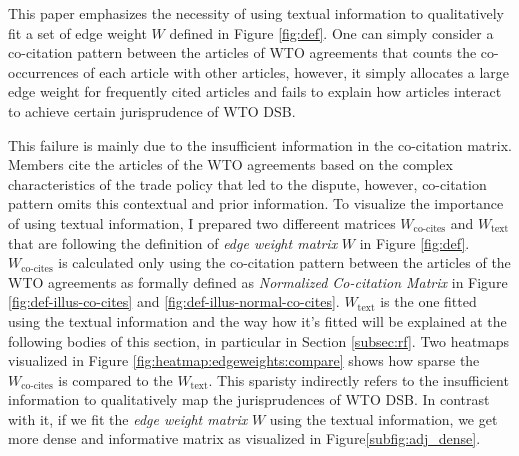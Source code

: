 This paper emphasizes the necessity of using textual information 
to qualitatively fit a set of edge weight $W$ defined in Figure \ref{fig:def}. %
One can simply consider a co-citation pattern between the articles of WTO agreements that counts the co-occurrences of each article with other articles, however,
it simply allocates a large edge weight for frequently cited articles and fails to explain how articles interact to achieve certain jurisprudence of WTO DSB. %

This failure is mainly due to the insufficient information in the co-citation matrix. Members cite the articles of 
the WTO agreements based on the complex characteristics of 
the trade policy that led to the dispute, however, co-citation pattern omits this contextual and prior information. To visualize the importance of using textual information, I prepared two differeent matrices $W_{\text{co-cites}}$ and $W_{\text{text}}$ that are following the definition of \textit{edge weight matrix} $W$ in Figure \ref{fig:def}.
$W_{\text{co-cites}}$ is calculated only using the co-citation pattern between the articles of the WTO agreements as formally defined as \textit{Normalized Co-citation Matrix} in Figure \ref{fig:def-illus-co-cites} and \ref{fig:def-illus-normal-co-cites}. 
$W_{\text{text}}$ is the one fitted using the textual information and the way how it's fitted will be explained at the following bodies of this section, in particular in Section \ref{subsec:rf}.
Two heatmaps visualized in Figure \ref{fig:heatmap:edgeweights:compare} shows how sparse the $W_{\text{co-cites}}$ is compared to the $W_{\text{text}}$. This sparisty indirectly refers to the insufficient information
to qualitatively map the jurisprudences of WTO DSB. 
In contrast with it, if we fit the \textit{edge weight matrix} $W$ using the textual information, we get more dense and informative matrix as visualized in Figure\ref{subfig:adj_dense}.





